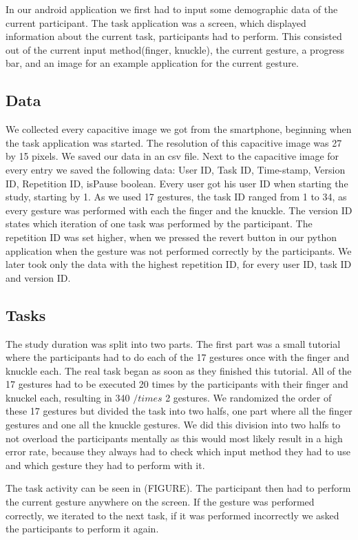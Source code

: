 \documentclass[sigchi-a, authorversion]{acmart}
\begin{document}
In our android application we first had to input some demographic data of the current participant.
The task application was a screen, which displayed information about the current task, participants had to perform.
This consisted out of the current input method(finger, knuckle), the current gesture, a progress bar, and an image for an example application for the current gesture.

\subsection{Data}
We collected every capacitive image we got from the smartphone, beginning when the task application was started.
The resolution of this capacitive image was 27 by 15 pixels.
We saved our data in an csv file.
Next to the capacitive image for every entry we saved the following data: User ID, Task ID, Time-stamp, Version ID, Repetition ID, isPause boolean.
Every user got his user ID when starting the study, starting by 1.
As we used 17 gestures, the task ID ranged from 1 to 34, as every gesture was performed with each the finger and the knuckle.
The version ID states which iteration of one task was performed by the participant.
The repetition ID was set higher, when we pressed the revert button in our python application when the gesture was not performed correctly by the participants.
We later took only the data with the highest repetition ID, for every user ID, task ID and version ID.

\subsection{Tasks}
The study duration was split into two parts.
The first part was a small tutorial where the participants had to do each of the 17 gestures once with the finger and knuckle each. 
The real task began as soon as they finished this tutorial.
All of the 17 gestures had to be executed 20 times by the participants with their finger and knuckel each, resulting in 340 $/times$ 2 gestures. 
We randomized the order of these 17 gestures but divided the task into two halfs, one part where all the finger gestures and one all the knuckle gestures.
We did this division into two halfs to not overload the participants mentally as this would most likely result in a high error rate, because they always had to check which input method they had to use and which gesture they had to perform with it.

The task activity can be seen in (FIGURE).
The participant then had to perform the current gesture anywhere on the screen.
If the gesture was performed correctly, we iterated to the next task, if it was performed incorrectly we asked the participants to perform it again.
\end{document}
